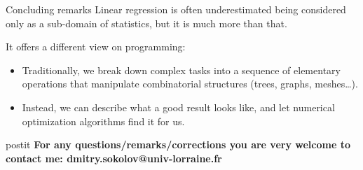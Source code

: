 \documentclass[UKenglish,aspectratio=169]{beamer}
\begin{document}
\begin{frame}{Concluding remarks}
Linear regression is often underestimated being considered only as a sub-domain of statistics, but it is much more than that.

\vspace{2ex}

It offers a different view on programming:
\begin{itemize}
\item Traditionally, we break down complex tasks into a sequence of elementary operations that manipulate combinatorial structures (trees, graphs, meshes\dots).
\item Instead, we can describe what a good result looks like, and let numerical optimization algorithms find it for us.
\end{itemize}

\vspace{4ex}


\begin{beamercolorbox}[sep=1em,wd=\linewidth]{postit}
\centering
\textbf{For any questions/remarks/corrections you are very welcome to contact me: dmitry.sokolov@univ-lorraine.fr}
\end{beamercolorbox}

\end{frame}

\end{document}
